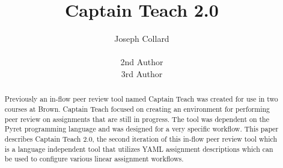 \documentclass{sig-alternate}
\begin{document}
%

\title{Captain Teach 2.0}

%
\author{
%
%
\alignauthor
Joseph Collard\\
       \\
\alignauthor
2nd Author
       \\
\alignauthor 
3rd Author
       \\
}

\maketitle
\begin{abstract}
Previously an in-flow peer review tool named Captain Teach was created for use 
in two courses at Brown. Captain Teach focused on creating an environment for
performing peer review on assignments that are still in progress.  
The tool was dependent on the Pyret programming language and was designed for 
a very specific workflow. This paper describes Captain Teach 2.0, the second 
iteration of this in-flow peer review tool which is a language independent tool 
that utilizes YAML assignment descriptions which can be used to configure various
linear assignment workflows. 
\end{abstract}

\end{document}
